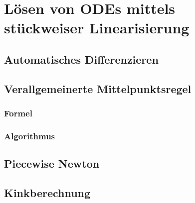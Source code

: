 \chapter{Lösen von ODEs mittels stückweiser Linearisierung}

\section{Automatisches Differenzieren}


\section{Verallgemeinerte Mittelpunktsregel}
\subsection{Formel}
\subsection{Algorithmus}
\section{Piecewise Newton}

\section{Kinkberechnung}